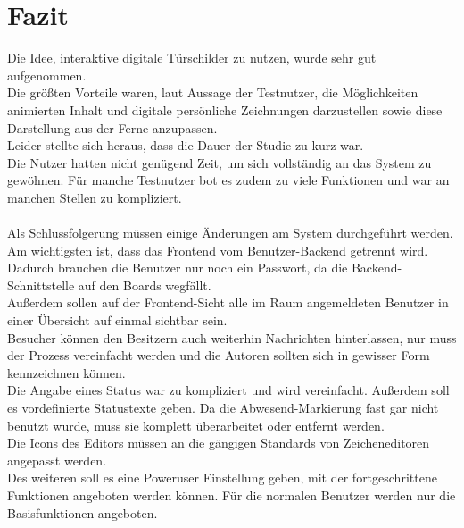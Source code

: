\chapter{Fazit}\label{Fazit}
Die Idee, interaktive digitale Türschilder zu nutzen, wurde sehr gut aufgenommen.
\\
Die größten Vorteile waren, laut Aussage der Testnutzer, die Möglichkeiten animierten Inhalt und digitale persönliche Zeichnungen darzustellen sowie diese Darstellung aus der Ferne anzupassen.
\\
Leider stellte sich heraus, dass die Dauer der Studie zu kurz war.
\\
Die Nutzer hatten nicht genügend Zeit, um sich vollständig an das System zu gewöhnen.
Für manche Testnutzer bot es zudem zu viele Funktionen und war an manchen Stellen zu kompliziert.
\\
\\
Als Schlussfolgerung müssen einige Änderungen am System durchgeführt werden.
Am wichtigsten ist, dass das Frontend vom Benutzer-Backend getrennt wird.
Dadurch brauchen die Benutzer nur noch ein Passwort, da die Backend-Schnittstelle auf den Boards wegfällt.
\\
Außerdem sollen auf der Frontend-Sicht alle im Raum angemeldeten Benutzer in einer Übersicht auf einmal sichtbar sein.
\\
Besucher können den Besitzern auch weiterhin Nachrichten hinterlassen, nur muss der Prozess vereinfacht werden und die Autoren sollten sich in gewisser Form kennzeichnen können.
\\
Die Angabe eines Status war zu kompliziert und wird vereinfacht.
Außerdem soll es vordefinierte Statustexte geben.
Da die Abwesend-Markierung fast gar nicht benutzt wurde, muss sie komplett überarbeitet oder entfernt werden.
\\
Die Icons des Editors müssen an die gängigen Standards von Zeicheneditoren angepasst werden.
\\
Des weiteren soll es eine Poweruser Einstellung geben, mit der fortgeschrittene Funktionen angeboten werden können. Für die normalen Benutzer werden nur die Basisfunktionen angeboten.
